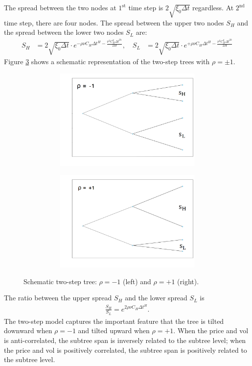 \documentclass[12pt]{article}
\numberwithin{equation}{section}
\begin{document}
The spread between the two nodes at $1^{\text{st}}$ time step is $2\sqrt{\xi_0\Delta t}$ regardless. At $2^{\text{nd}}$ time step, there are four nodes. The spread between the upper two nodes $S_H$ and the spread between the lower two nodes $S_L$ are:
\begin{align}
S_H &= 2\sqrt{\xi_0\Delta t}\cdot e^{-\rho\nu C_H \Delta t^H -\frac{\nu^2 C_H^2 \Delta t^{2h}}{2H}}, \quad S_L &= 2\sqrt{\xi_0\Delta t}\cdot e^{+\rho\nu C_H \Delta t^H -\frac{\nu^2 C_H^2 \Delta t^{2h}}{2H}}
\end{align}
Figure \ref{fig:schematictree} shows a schematic representation of the two-step trees with $\rho=\pm 1$.
\begin{figure}[htb!]
\begin{center}
  \begin{subfigure}{0.5\textwidth}
    \centering
    \includegraphics[width=1.0\textwidth, height=5cm]{shsl_1}
    \label{fig:1}
  \end{subfigure}%
  \begin{subfigure}{0.5\textwidth}
    \centering
    \includegraphics[width=1.0\textwidth, height=5cm]{shsl_2}
    \label{fig:2}
  \end{subfigure}
\caption{Schematic two-step tree: $\rho=-1$ (left) and $\rho=+1$ (right).}
\label{fig:schematictree}
\end{center}
\end{figure}
\newline
The ratio between the upper spread $S_H$ and the lower spread $S_L$ is
\begin{align}
\frac{S_H}{S_L} = e^{2\rho\nu C_H \Delta t^H}.
\end{align}
The two-step model captures the important feature that the tree is tilted downward when $\rho=-1$ and tilted upward when $\rho=+1$. When the price and vol is anti-correlated, the subtree span is inversely related to the subtree level; when the price and vol is positively correlated, the subtree span is positively related to the subtree level.
\end{document}
